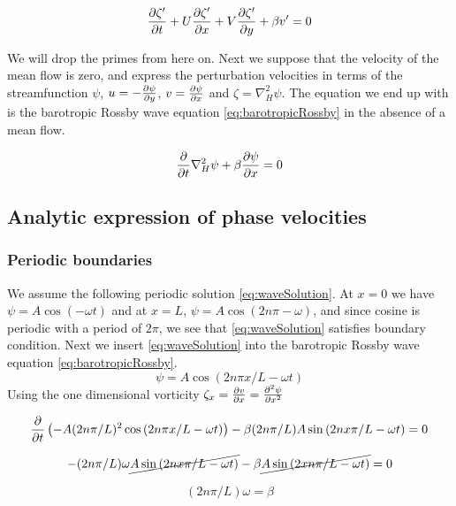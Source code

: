 \begin{equation}
    \pdv{\zeta '}{t} + U\pdv{\zeta'}{x} + V\pdv{\zeta'}{y} + \beta v' = 0
\end{equation}

We will drop the primes from here on. Next we suppose that the velocity of
the mean flow is zero, and express the perturbation velocities in terms of the streamfunction
$\psi$, $u = -\pdv{\psi}{y}$, $v = \pdv{\psi}{x}$ and $\zeta = \nabla_H^2 \psi
$. The equation we end up with is the barotropic Rossby wave equation
\cref{eq:barotropicRossby} in the absence of a mean flow.

\begin{equation}\label{eq:barotropicRossby}
    \pdv{}{t} \nabla_H^2 \psi + \beta \pdv{\psi}{x} = 0
\end{equation}

\subsection{Analytic expression of phase velocities}
\subsubsection{Periodic boundaries}
We assume the following periodic solution \cref{eq:waveSolution}.
At $x=0$ we have $\psi = A\cos{(-\omega t)}$ and at $x = L$, $\psi = A
\cos{(2n\pi -\omega)}$, and since cosine is periodic with a period of $2\pi$,
we see that \cref{eq:waveSolution} satisfies boundary condition.
Next we insert \cref{eq:waveSolution} into the barotropic Rossby wave equation
\cref{eq:barotropicRossby}.
\begin{equation}\label{eq:waveSolution}
    \psi = A\cos{(2n\pi x /L - \omega t)}
\end{equation}
Using the one dimensional vorticity $\zeta_x = \pdv{v}{x} = \pdv[2]{\psi}{x}$

\begin{equation}
    \pdv{}{t} \left(-A (2n\pi/L)^2  \cos{(2n\pi x/L - \omega t)}\right) - \beta
     (2n\pi/L) A \sin{(2n x\pi/L - \omega t) = 0}
\end{equation}

\begin{equation}
    -(2n\pi/L)\omega \cancel{A\sin{(2n x\pi/L - \omega t)}} - \beta
    \cancel{A\sin{(2 xn\pi/L - \omega t)}} = 0
\end{equation}

\begin{equation}
    (2n\pi / L) \omega = \beta
\end{equation}

